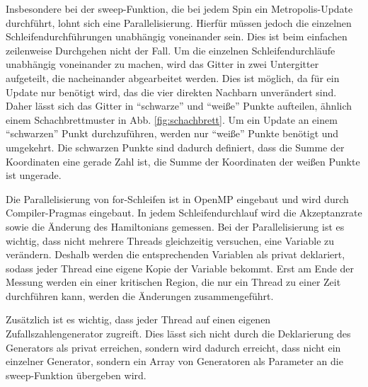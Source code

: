 \documentclass{scrreprt}
\begin{document}
	Insbesondere bei der sweep-Funktion, die bei jedem Spin ein Metropolis-Update durchführt, lohnt sich eine Parallelisierung. Hierfür müssen jedoch die einzelnen Schleifendurchführungen unabhängig voneinander sein. Dies ist beim einfachen zeilenweise Durchgehen nicht der Fall.
	Um die einzelnen Schleifendurchläufe unabhängig voneinander zu machen, wird das Gitter in zwei Untergitter aufgeteilt, die nacheinander abgearbeitet werden. Dies ist möglich, da für ein Update nur benötigt wird, das die vier direkten Nachbarn unverändert sind. Daher lässt sich das Gitter in \enquote{schwarze}
	und \enquote{weiße} Punkte aufteilen, ähnlich einem Schachbrettmuster in Abb. \ref{fig:schachbrett}. Um ein Update an einem \enquote{schwarzen} Punkt durchzuführen, werden nur \enquote{weiße} Punkte benötigt und umgekehrt. Die schwarzen Punkte sind dadurch definiert, dass die Summe der Koordinaten eine gerade Zahl ist, die Summe der Koordinaten der weißen Punkte ist ungerade.
	
	Die Parallelisierung von for-Schleifen ist in OpenMP eingebaut und wird durch Compiler-Pragmas eingebaut. In jedem Schleifendurchlauf wird die Akzeptanzrate sowie die Änderung des Hamiltonians gemessen. Bei der Parallelisierung ist es wichtig, dass nicht mehrere Threads gleichzeitig versuchen, eine Variable zu verändern. Deshalb werden die entsprechenden Variablen als privat deklariert, sodass jeder Thread eine eigene Kopie der Variable bekommt. Erst am Ende der Messung werden ein einer kritischen Region, die nur ein Thread zu einer Zeit durchführen kann, werden die Änderungen zusammengeführt. 	%
	
	
	Zusätzlich ist es wichtig, dass jeder Thread auf einen eigenen Zufallszahlengenerator zugreift. Dies lässt sich nicht durch die Deklarierung des Generators als privat erreichen, sondern wird dadurch erreicht, dass nicht ein einzelner Generator, sondern ein Array von Generatoren als Parameter an die sweep-Funktion übergeben wird.
	
\end{document}
